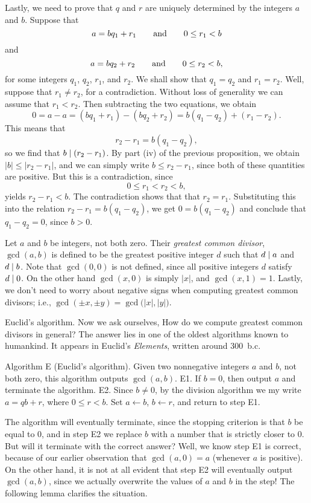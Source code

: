 \endgroup%
Lastly, we need to prove that $q$ and $r$ are uniquely determined by the integers $a$ and
$b$. Suppose that
$$a = bq_1 + r_1\qquad\hbox{and}\qquad 0\le r_1 < b$$
and
$$a = bq_2 + r_2\qquad\hbox{and}\qquad 0\le r_2 < b,$$
for some integers $q_1$, $q_2$, $r_1$, and $r_2$. We shall show that $q_1 = q_2$
and $r_1 = r_2$. Well, suppose that $r_1\ne r_2$, for a contradiction. Without loss
of generality we can assume that $r_1 < r_2$. Then subtracting the two equations, we obtain
$$ 0 = a-a = (bq_1 + r_1) - (bq_2 + r_2) = b(q_1-q_2) + (r_1 - r_2).$$
This means that
$$r_2 - r_1 = b(q_1 - q_2),$$
so we find that $b\mid (r_2 - r_1)$. By part (iv) of the previous proposition,
we obtain $|b| \le |r_2-r_1|$, and we can simply write $b \le r_2 -r_1$, since both of
these quantities are positive. But this is a contradiction, since
$$ 0\le r_1 < r_2 < b,$$
yields $r_2 - r_1 < b$. The contradiction shows that that $r_2 = r_1$. Substituting this
into the relation $r_2 - r_1 = b(q_1 - q_2)$, we get $0 = b(q_1 - q_2)$ and conclude that
$q_1 - q_2 = 0$, since $b>0$.\slug

Let $a$ and $b$ be integers, not both zero. Their {\it greatest common divisor}, $\gcd(a,b)$
is defined to be the greatest positive integer $d$ such that $d\mid a$ and $d\mid b$.
Note that $\gcd(0,0)$ is not defined, since all positive integers $d$ satisfy $d\mid 0$.
On the other hand $\gcd(x,0)$ is simply $|x|$, and $\gcd(x,1) = 1$. Lastly, we don't
need to worry about negative signs when computing greatest common divisors; i.e.,
$\gcd(\pm x, \pm y) = \gcd\bigl(|x|, |y|\bigr)$.

\medskip\boldlabel Euclid's algorithm.
Now we ask ourselves, How do we compute greatest common divisors in general? The answer
lies in one of the oldest algorithms known to humankind. It appears in Euclid's {\sl Elements},
written around 300~{\sc b.c.}

\algbegin Algorithm E (Euclid's algorithm). Given two nonnegative integers $a$ and $b$, not both zero,
this algorithm outputs $\gcd(a,b)$.
\algstep E1. If $b=0$, then output $a$ and terminate the algorithm.
\algstep E2. Since $b\ne 0$, by the division algorithm we my write $a = qb+r$, where $0\le r < b$.
Set $a\gets b$, $b\gets r$, and return to step E1.\slug

The algorithm will eventually terminate, since the stopping criterion is that $b$ be equal to $0$,
and in step E2 we replace $b$ with a number that is strictly closer to $0$. But will it terminate
with the correct answer? Well, we know step E1 is correct,
because of our earlier observation that $\gcd(a,0) = a$ (whenever $a$
is positive). On the other hand, it is not at all evident that step E2 will eventually output
$\gcd(a,b)$, since we actually overwrite the values of $a$ and $b$ in the step! The following lemma
clarifies the situation.

